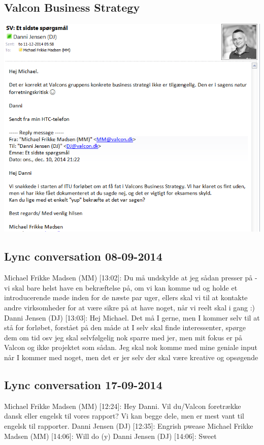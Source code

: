 \begin{linenumbers*}
\subsection{Valcon Business Strategy}
\includegraphics[width=1.36\textwidth]{appendix/danni_communication_2}

\subsection{Lync conversation 08-09-2014}
Michael Frikke Madsen (MM) [13:02]: 
Du må undskylde at jeg sådan presser på - vi skal bare helst have en bekræftelse på, om vi kan komme ud og holde et introducerende møde inden for de næste par uger, ellers skal vi til at kontakte andre virksomheder for at være sikre på at have noget, når vi reelt skal i gang :) \newline
Danni Jensen (DJ) [13:03]: 
Hej Michael. Det må I gerne, men I kommer selv til at stå for forløbet, forstået på den måde at I selv skal finde interessenter, spørge dem om tid osv
jeg skal selvfølgelig nok sparre med jer, men mit fokus er på Valcon og ikke projektet som sådan. Jeg skal nok komme med mine geniale input når I kommer med noget, men det er jer selv der skal være kreative og opsøgende

\subsection{Lync conversation 17-09-2014}
Michael Frikke Madsen (MM) [12:24]: 
Hey Danni. Vil du/Valcon foretrække dansk eller engelsk til vores rapport?
Vi kan begge dele, men er mest vant til engelsk til rapporter. \newline
Danni Jensen (DJ) [12:35]: 
Engrish pwease \newline
Michael Frikke Madsen (MM) [14:06]: 
Will do (y) \newline
Danni Jensen (DJ) [14:06]: 
Sweet


\end{linenumbers*}
